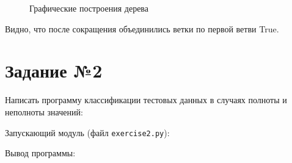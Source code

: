 \documentclass{article} %
\begin{document}
\begin{figure}[H]
	\centering
	\hfill
    \caption{Графические построения дерева}
\end{figure}

Видно, что после сокращения объединились ветки по первой ветви True.

\clearpage
\section{Задание №2}
Написать программу классификации тестовых данных в случаях полноты и
неполноты значений:
\bigskip

Запускающий модуль (файл \verb$exercise2.py$):
\bigskip

Вывод программы:


\end{document}
